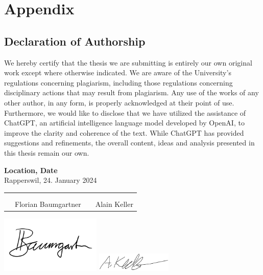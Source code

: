 \chapter{Appendix}
\clearpage

\section{Declaration of Authorship} \label{Declaration of Authorship}
We hereby certify that the thesis we are submitting is entirely our own original work except where otherwise indicated.
We are aware of the University's regulations concerning plagiarism, including those regulations concerning disciplinary actions that may result from plagiarism.
Any use of the works of any other author, in any form, is properly acknowledged at their point of use.
Furthermore, we would like to disclose that we have utilized the assistance of ChatGPT, an artificial intelligence language model developed by OpenAI,
to improve the clarity and coherence of the text. While ChatGPT has provided suggestions and refinements,
the overall content, ideas and analysis presented in this thesis remain our own.

\bigskip
\textbf{Location, Date} \\
Rapperswil, 24. January 2024

\vspace{1.2cm}
\begin{tabular}{@{}p{0.1cm}p{6cm}p{0.6cm}p{6cm}@{}}
	 & \hrulefill          &  & \hrulefill   \\ \\[-0.7em]
	 & Florian Baumgartner &  & Alain Keller \\
\end{tabular}

\includegraphics[width=4.8cm, align=t, smash=br, hshift=0.9cm, vshift=2.55cm]{appendix/Signature_Florian_Baumgartner.pdf}
\includegraphics[width=3.6cm, align=t, smash=br, hshift=8.25cm, vshift=1.8cm]{appendix/Signature_Alain_Keller.png}
\newpage

